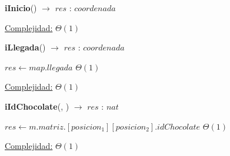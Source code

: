 \documentclass{book}
\begin{document}
\begin{Algoritmos}
\begin{algorithm}[H]{\textbf{iInicio}() $\to$ $res$ : $coordenada$}
\begin{algorithmic}[1]
                \medskip
                \Statex \underline{Complejidad:} $\Theta(1)$
            \end{algorithmic}
    \end{algorithm}

    \begin{algorithm}[H]{\textbf{iLlegada}() $\to$ $res$ : $coordenada$}
        \begin{algorithmic}[1]
                \State $res \gets map.llegada$                                                                \Comment $\Theta(1)$

                \medskip
                \Statex \underline{Complejidad:} $\Theta(1)$
            \end{algorithmic}
    \end{algorithm}


	 \begin{algorithm}[H]{\textbf{iIdChocolate}(, ) $\to$ $res$ : $nat$}
		\begin{algorithmic}[1]
			\State $res \gets m.matriz.[posicion_1][posicion_2].idChocolate$                                                                 \Comment $\Theta(1)$
			
			\medskip
			\Statex \underline{Complejidad:} $\Theta(1)$
		\end{algorithmic}
	\end{algorithm}

\end{Algoritmos}
\end{document}
